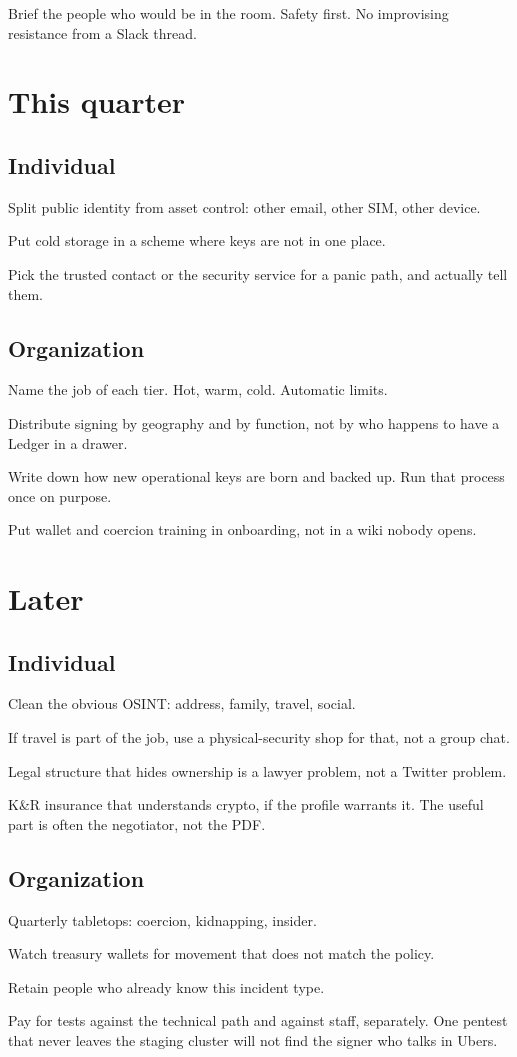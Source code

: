 Brief the people who would be in the room. Safety first.
No improvising resistance from a Slack thread.

\section{This quarter}

\subsection{Individual}

Split public identity from asset control: other email,
other SIM, other device.

Put cold storage in a scheme where keys are not in one
place.

Pick the trusted contact or the security service for a
panic path, and actually tell them.

\subsection{Organization}

Name the job of each tier. Hot, warm, cold. Automatic
limits.

Distribute signing by geography and by function, not by
who happens to have a Ledger in a drawer.

Write down how new operational keys are born and backed
up. Run that process once on purpose.

Put wallet and coercion training in onboarding, not in a
wiki nobody opens.

\section{Later}

\subsection{Individual}

Clean the obvious OSINT: address, family, travel, social.

If travel is part of the job, use a physical-security
shop for that, not a group chat.

Legal structure that hides ownership is a lawyer problem,
not a Twitter problem.

K\&R insurance that understands crypto, if the profile
warrants it. The useful part is often the negotiator,
not the PDF.

\subsection{Organization}

Quarterly tabletops: coercion, kidnapping, insider.

Watch treasury wallets for movement that does not match
the policy.

Retain people who already know this incident type.

Pay for tests against the technical path and against
staff, separately. One pentest that never leaves the
staging cluster will not find the signer who talks in
Ubers.
